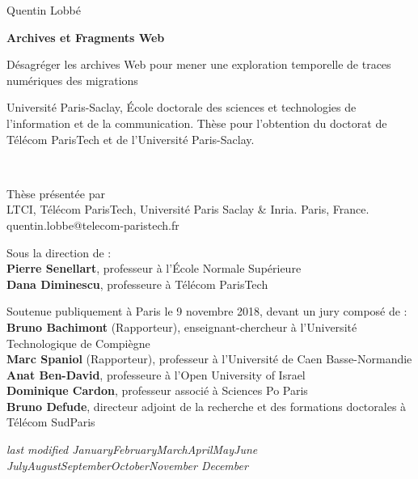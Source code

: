 \documentclass[symmetric,justified,marginals=raggedouter]{tufte-book}
\newcommand{\monthyear}{%
  \ifcase\month\or January\or February\or March\or April\or May\or June\or
  July\or August\or September\or October\or November\or
  December\fi\space\number\year
}
\newcommand{\blankpage}{\newpage\hbox{}\thispagestyle{empty}\newpage}
\begin{document}
\frontmatter


\newpage
\author{Quentin Lobbé}
\title{}
\cleardoublepage
{  
  \begin{fullwidth}%
  \thispagestyle{empty} 
  \setlength{\parskip}{\baselineskip}
  \begingroup
  \vspace*{10em}
  \par\noindent\Large{Quentin Lobbé}
  \vspace*{-1em}
  \par\noindent\Huge\textbf{Archives et Fragments Web}
  \par\noindent\nohyphenation\Large{Désagréger les archives Web pour mener une exploration temporelle de traces numériques des migrations}
  \endgroup
  \vfill  
  \par\noindent\nohyphenation Université Paris-Saclay, École doctorale des sciences et technologies de l'information et de la communication.  Thèse pour l'obtention du doctorat de Télécom ParisTech et de l'Université Paris-Saclay.    
  \end{fullwidth}%
}

\blankpage

  
\newpage
\begin{fullwidth}
~\vfill
\thispagestyle{empty}
\setlength{\parskip}{\baselineskip}

\par\noindent Thèse présentée par \textbf{\thanklessauthor}\\
LTCI, Télécom ParisTech, Université Paris Saclay \& Inria. Paris, France.\\
quentin.lobbe@telecom-paristech.fr

\par\noindent Sous la direction de :\\
\textbf{Pierre Senellart}, professeur à l'École Normale Supérieure\\
\textbf{Dana Diminescu}, professeure à Télécom ParisTech

\par\noindent Soutenue publiquement à Paris le 9 novembre 2018, devant un jury composé de :\\
\textbf{Bruno Bachimont} (Rapporteur), enseignant-chercheur à l'Université Technologique de Compiègne\\
\textbf{Marc Spaniol} (Rapporteur), professeur à l'Université de Caen Basse-Normandie\\
\textbf{Anat Ben-David}, professeure à l'Open University of Israel\\
\textbf{Dominique Cardon}, professeur associé à Sciences Po Paris\\
\textbf{Bruno Defude}, directeur adjoint de la recherche et des formations doctorales à Télécom SudParis

\par\textit{last modified \monthyear}
\end{fullwidth}
  
\end{document}
